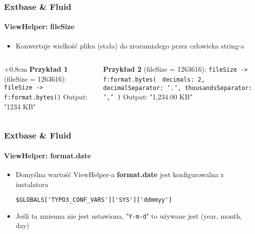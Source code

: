 \begin{frame}[fragile]
	\frametitle{Extbase \& Fluid}
	\framesubtitle{ViewHelper: fileSize}

	\begin{itemize}
		\item Konwertuje wielkość pliku (stała) do zrozumiałego przez człowieka string-a\newline
	\end{itemize}

	\begin{columns}[T]

		\begin{column}{.5\textwidth}
			\advance\leftskip+0.8cm
			\smaller
				\textbf{Przykład 1} (fileSize = 1263616):\newline
				\texttt{fileSize -> f:format.bytes()}\newline
				\newline
				Output: "1234 KB"
			\normalsize
		\end{column}
		\begin{column}{.5\textwidth}
			\smaller
				\textbf{Przykład 2} (fileSize = 1263616):\newline
				\texttt{fileSize -> f:format.bytes(}\newline
				\texttt{
				decimals: 2,\newline
				decimalSeparator: '.',\newline
				thousandsSeparator: ','\newline
				)}\newline
				\newline
				Output: "1,234.00 KB"
			\normalsize
		\end{column}

	\end{columns}

\end{frame}


\begin{frame}[fragile]
	\frametitle{Extbase \& Fluid}
	\framesubtitle{ViewHelper: format.date}

	\lstset{
		basicstyle=\smaller\ttfamily
	}

	\begin{itemize}
		\item Domyślna wartość ViewHelper-a \textbf{format.date} jest konfigurowalna z instalatora

			\lstinline!$GLOBALS['TYPO3_CONF_VARS']['SYS']['ddmmyy']!

		\item Jeśli ta zmienna nie jest ustawiona, "\texttt{Y-m-d}" to używane jest (year, month, day)

	\end{itemize}

\end{frame}

